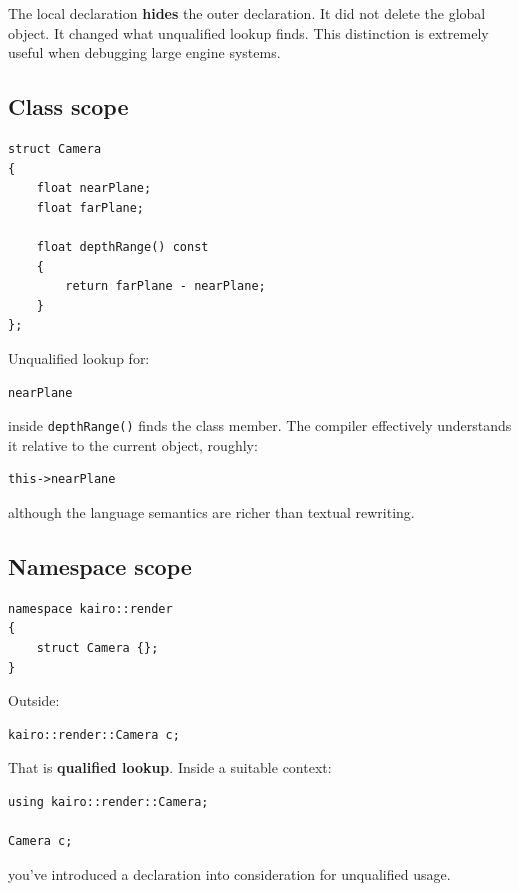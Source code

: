 The local declaration \textbf{hides} the outer declaration. It did not delete the global object. It changed what unqualified lookup finds. This distinction is extremely useful when debugging large engine systems.

\subsection{Class scope}\label{01-foundations-i-ch002-class-scope}

\begin{verbatim}
struct Camera
{
    float nearPlane;
    float farPlane;

    float depthRange() const
    {
        return farPlane - nearPlane;
    }
};
\end{verbatim}

Unqualified lookup for:

\begin{verbatim}
nearPlane
\end{verbatim}

inside \texttt{depthRange()} finds the class member. The compiler effectively understands it relative to the current object, roughly:

\begin{verbatim}
this->nearPlane
\end{verbatim}

although the language semantics are richer than textual rewriting.

\subsection{Namespace scope}\label{01-foundations-i-ch002-namespace-scope}

\begin{verbatim}
namespace kairo::render
{
    struct Camera {};
}
\end{verbatim}

Outside:

\begin{verbatim}
kairo::render::Camera c;
\end{verbatim}

That is \textbf{qualified lookup}. Inside a suitable context:

\begin{verbatim}
using kairo::render::Camera;

Camera c;
\end{verbatim}

you've introduced a declaration into consideration for unqualified usage.

